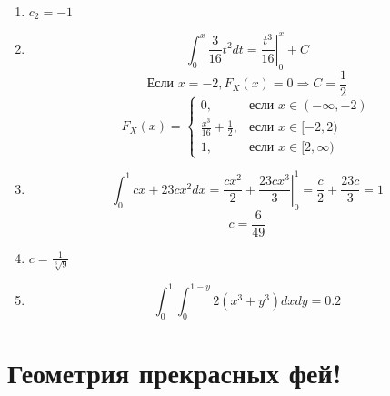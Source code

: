 \documentclass[a4paper,12pt]{article}
\begin{document}
\begin{enumerate}
\item $c_2 = -1$
\item %
\[
\int_0^x \frac{3}{16}t^2 dt = \left. \frac{t^3}{16} \right|_0^x + C
\]
\[
\text{Если } x= -2, F_X(x) = 0 \Rightarrow C = \frac{1}{2}
\]
\[
F_X(x) = \begin{cases}
0, &\text{если } x\in(-\infty , -2) \\
\frac{x^3}{16} + \frac{1}{2},&\text{если } x\in[-2, 2) \\
1,&\text{если } x\in[2, \infty)
\end{cases}
\]
\item %
\[
\int_0^1 cx+23cx^2 dx = \frac{cx^2}{2} + \left. \frac{23cx^3}{3} \right|_0^1 = \frac{c}{2} + \frac{23c}{3} = 1
\]
\[
c = \frac{6}{49}
\]
\item $c = \frac{1}{\sqrt[3]{9}}$
\item %
\[
\int_0^1\int_0^{1-y}2(x^3 + y^3)dxdy = 0.2
\]
\end{enumerate}


\newpage

\section{Геометрия прекрасных фей!} %
\end{document}
